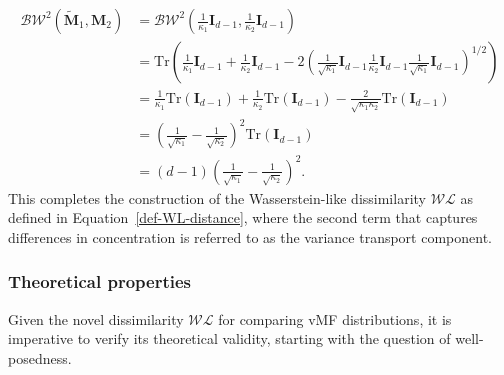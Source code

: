 \documentclass[10pt]{article}
\newcommand{\bfM}{\boldsymbol{M}}
\newcommand{\bfI}{\boldsymbol{I}}
\newcommand{\WL}{\mathcal{WL}}
\begin{document}
\begin{align*}
\mathcal{BW}^2 (\tilde{\bfM}_1, \bfM_2) &= \mathcal{BW}^2 \left(\frac{1}{\kappa_1} \bfI_{d-1}, \frac{1}{\kappa_2} \bfI_{d-1}\right) \\ 
&= \mathrm{Tr}\left(
\frac{1}{\kappa_1} \bfI_{d-1} + \frac{1}{\kappa_2} \bfI_{d-1}
- 2 \left( 
\frac{1}{\sqrt{\kappa_1}} \bfI_{d-1} \frac{1}{\kappa_2} \bfI_{d-1} \frac{1}{\sqrt{\kappa_1}} \bfI_{d-1}
\right)^{1/2}
\right) \\
	&=\frac{1}{\kappa_1} \mathrm{Tr}\left(
\bfI_{d-1}
\right)
+ \frac{1}{\kappa_2}\mathrm{Tr}\left(
 \bfI_{d-1}
\right)
- \frac{2}{\sqrt{\kappa_1 \kappa_2}} \mathrm{Tr}\left(
 \bfI_{d-1}
\right)\\
&= \left(
\frac{1}{\sqrt{\kappa_1}} - \frac{1}{\sqrt{\kappa_2}}
\right)^2 \mathrm{Tr}(\bfI_{d-1}) \\
&= (d-1) \left(
\frac{1}{\sqrt{\kappa_1}} - \frac{1}{\sqrt{\kappa_2}}
\right)^2.
\end{align*}
This completes the construction of the Wasserstein-like dissimilarity $\WL$ as defined in Equation~\eqref{def-WL-distance}, where the second term that captures differences in concentration is referred to as the variance transport component.


\subsubsection{Theoretical properties}


Given the novel dissimilarity $\WL$ for comparing vMF distributions, it is imperative to verify its theoretical validity, starting with the question of well-posedness.
\end{document}
